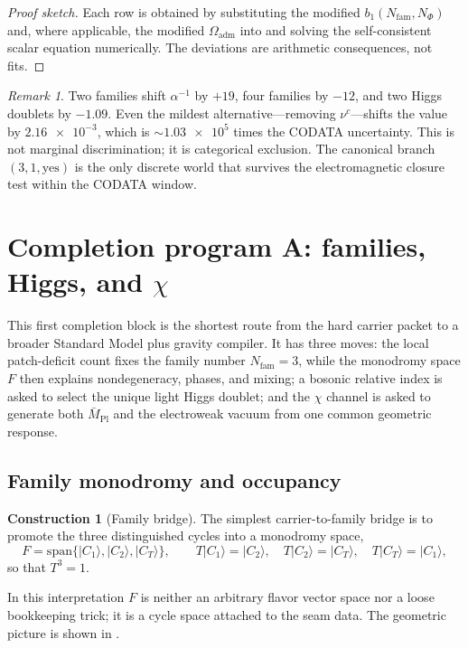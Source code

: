 \documentclass[11pt,a4paper]{article}
\theoremstyle{definition}
\newtheorem{construction}[theorem]{Construction}
\theoremstyle{remark}
\newtheorem*{remark}{Remark}
\newcommand{\Mpl}{\bar M_{\mathrm{Pl}}}
\newcommand{\bone}{b_1}
\newcommand{\Oadm}{\Omega_{\mathrm{adm}}}
\begin{document}
\begin{proof}[Proof sketch]
Each row is obtained by substituting the modified $\bone(N_{\mathrm{fam}},N_\Phi)$ and, where applicable, the modified $\Oadm$ into  and solving the self-consistent scalar equation numerically. The deviations are arithmetic consequences, not fits.
\end{proof}

\begin{remark}
Two families shift $\alpha^{-1}$ by $+19$, four families by $-12$, and two Higgs doublets by $-1.09$. Even the mildest alternative---removing $\nu^c$---shifts the value by $\num{2.16e-3}$, which is $\sim\num{1.03e5}$ times the CODATA uncertainty. This is not marginal discrimination; it is categorical exclusion. The canonical branch $(3,1,\text{yes})$ is the only discrete world that survives the electromagnetic closure test within the CODATA window.
\end{remark}

\section{Completion program A: families, Higgs, and \texorpdfstring{$\chi$}{chi}}

This first completion block is the shortest route from the hard carrier packet to a broader Standard Model plus gravity compiler. It has three moves: the local patch-deficit count fixes the family number $N_{\mathrm{fam}}=3$, while the monodromy space $F$ then explains nondegeneracy, phases, and mixing; a bosonic relative index is asked to select the unique light Higgs doublet; and the $\chi$ channel is asked to generate both $\Mpl$ and the electroweak vacuum from one common geometric response.

\subsection{Family monodromy and occupancy}

\begin{construction}[Family bridge]
The simplest carrier-to-family bridge is to promote the three distinguished cycles into a monodromy space,
\[
F=\mathrm{span}\{|C_1\rangle,|C_2\rangle,|C_T\rangle\},
\qquad
T|C_1\rangle=|C_2\rangle,\quad
T|C_2\rangle=|C_T\rangle,\quad
T|C_T\rangle=|C_1\rangle,
\]
so that $T^3=1$.
\end{construction}
In this interpretation $F$ is neither an arbitrary flavor vector space nor a loose bookkeeping trick; it is a cycle space attached to the seam data. The geometric picture is shown in .
\end{document}
